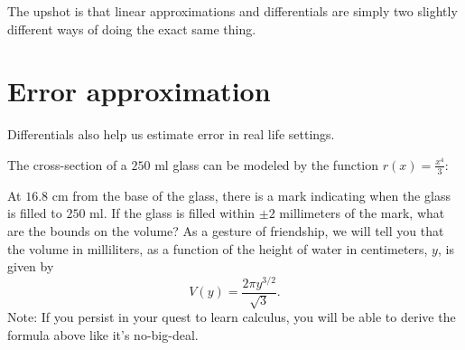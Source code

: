 \documentclass{ximera}
\begin{document}
The upshot is that linear approximations and differentials are simply
two slightly different ways of doing the exact same thing.

\section{Error approximation}

Differentials also help us estimate error in real life settings.

\begin{example}
  The cross-section of a $250$ ml glass can be modeled by the function
  $r(x) = \frac{x^4}{3}$:
  \begin{image}
  \end{image}
  At $16.8$ cm from the base of the glass, there is a mark indicating
  when the glass is filled to $250$ ml. If the glass is filled within
  $\pm 2$ millimeters of the mark, what are the bounds on the volume?
  As a gesture of friendship, we will tell you that the volume in
  milliliters, as a function of the height of water in centimeters, $y$,
  is given by
  \[
  V(y) = \frac{2\pi y^{3/2}}{\sqrt{3}}.
  \]
  Note: If you persist in your quest to learn calculus, you will be
  able to derive the formula above like it's no-big-deal.
 


 
\end{example}
\end{document}
